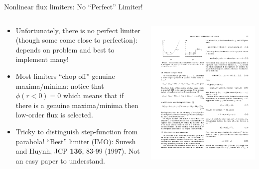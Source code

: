 \documentclass[aspectratio=169]{beamer}
\begin{document}
\begin{frame}{Nonlinear flux limiters: No ``Perfect'' Limiter!}
  \small
  \begin{columns}
    \begin{column}{0.5\linewidth}
      \begin{itemize}
      \item Unfortunately, there is no perfect limiter (though some
        come close to perfection): depends on problem and best to
        implement many!
      \item Most limiters ``chop off'' genuine maxima/minima: notice
        that $\phi(r<0) = 0$ which means that if there is a genuine
        maxima/minima then low-order flux is selected.
      \item Tricky to distinguish step-function from parabola!
        ``Best'' limiter (IMO): Suresh and Huynh, JCP {\bf 136}, 83-99
        (1997). Not an easy paper to understand.
      \end{itemize}
    \end{column}
    
    \begin{column}{0.5\linewidth}
      \includegraphics[width=\linewidth]{suresh-huynh.pdf}
    \end{column}
  \end{columns}
\end{frame}  
\end{document}
